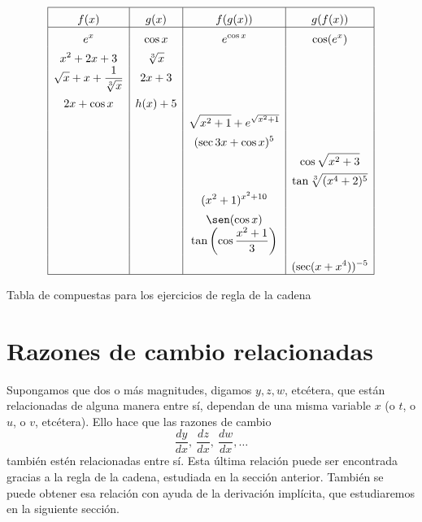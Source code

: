 \begin{table}[ht]
\[
{\setlength\extrarowheight{5pt}
\begin{array}{|>{\displaystyle}c|>{\displaystyle}c|>{\displaystyle}c|>{\displaystyle}c|} \hline
f(x) & g(x) & f(g(x)) & g(f(x)) \\ \hline
e^x & \cos x & e^{\cos x} & \cos (e^x) \\
x^2 + 2x + 3 & \sqrt[3]{x} & & \\
\sqrt{x} + x + \frac{1}{\sqrt[3]{x}} & 2x + 3 & & \\
2x + \cos x & h(x) + 5 & & \\
& & \sqrt{x^2 + 1} + e^{\sqrt{x^2 + 1}} & \\
& & (\sec 3x + \cos x)^5 & \\
& & & \cos\sqrt{x^2 + 3} \\
& & & \tan\sqrt[3]{(x^4 + 2)^5} \\
& & (x^2 + 1)^{x^2 + 10} & \\
& & \sen(\cos x) & \\
& & \tan\left(\cos\frac{x^2 + 1}{3}\right) & \\
& & & (\sec(x + x^4))^{-5} \\
\hline
\end{array}
}
\]
\caption{Tabla de compuestas para los ejercicios de regla de la cadena}
\label{tab:dcCompuestas}%
\end{table}

\section{Razones de cambio relacionadas}
Supongamos que dos o más magnitudes, digamos $y,z,w$, etcétera, que están relacionadas de alguna
manera entre sí, dependan de una misma variable $x$ (o $t$, o $u$, o $v$, etcétera). Ello hace que
las razones de cambio
\[
\frac{dy}{dx}, \ \frac{dz}{dx},\ \frac{dw}{dx}, \ldots
\]
también estén relacionadas entre sí. Esta última relación puede ser encontrada gracias a la regla
de la cadena, estudiada en la sección anterior. También se puede obtener esa relación con ayuda de
la derivación implícita, que estudiaremos en la siguiente sección.

